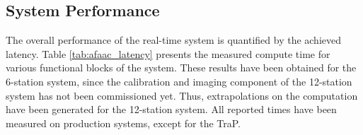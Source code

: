 \documentclass{ws-jai}
\begin{document}




\subsection {System Performance}
The overall  performance of the real-time  system is quantified by  the achieved
latency. Table  \ref{tab:afaac_latency} presents  the measured compute  time for
various functional  blocks of the system.  These results have been  obtained for
the  6-station  system, since  the  calibration  and  imaging component  of  the
12-station system  has not been  commissioned yet.  Thus, extrapolations  on the
computation have  been generated for  the 12-station system. All  reported times
have been measured on production systems, except for the TraP.
\end{document}
